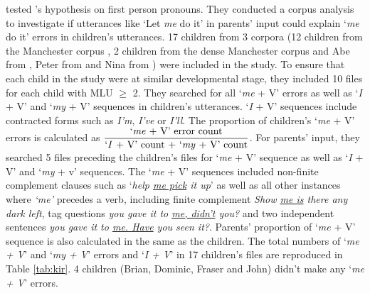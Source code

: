 \cite{kirjavainen2009can} tested \cite{tomasello2000,tomasello2003}'s hypothesis on first person pronouns. They conducted a corpus analysis to investigate if utterances like `Let \textit{me} do it' in parents' input could explain `\textit{me} do it' errors in children's utterances. 17 children from 3 corpora (12 children from the Manchester corpus \citep{theakston2001}, 2 children from the dense Manchester corpus \citep{lieven2009two} and Abe from \cite{kuczaj1977acquisition}, Peter from \cite{bloom1974imitation} and Nina from \cite{suppes1974semantics}) were included in the study. To ensure that each child in the study were at similar developmental stage, they included 10 files for each child with MLU $\geq$ 2. They searched for all `\textit{me} + V' errors as well as `\textit{I} + V' and `\textit{my} + V' sequences in children's utterances. `\textit{I} + V' sequences include contracted forms such as \textit{I'm}, \textit{I've} or \textit{I'll}. The proportion of children's `\textit{me} + V' errors is calculated as $\displaystyle\frac{\text{`\textit{me} + V' error count}}{\text{`\textit{I} + V' count + `\textit{my} + V' count}}$. For parents' input, they searched 5 files preceding the children's files for `\textit{me} + V' sequence as well as `\textit{I} + V' and `\textit{my} + v' sequences. The `\textit{me} + V' sequences included non-finite complement clauses such as `\textit{help \underline{me pick} it up}' as well as all other instances where \textit{`me'} precedes a verb, including finite complement \textit{Show \underline{me is} there any dark left}, tag questions \textit{you gave it to \underline{me, didn't} you?} and two independent sentences \textit{you gave it to \underline{me. Have} you seen it?}. Parents' proportion of `\textit{me} + V' sequence is also calculated in the same as the children. The total numbers  of `\textit{me + V}' and `\textit{my + V}' errors and `\textit{I + V}' in 17 children's files are reproduced in Table \ref{tab:kir}. 4 children (Brian, Dominic, Fraser and John) didn't make any `\textit{me + V}' errors.

